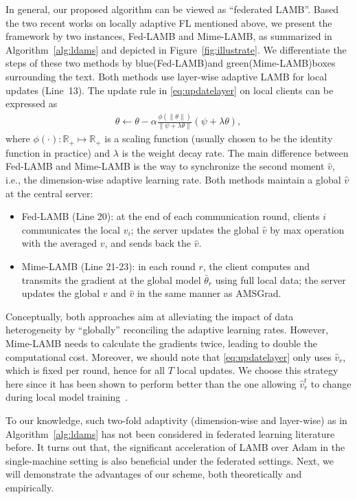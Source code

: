 \documentclass[nohyperref]{article}
\theoremstyle{plain}
\theoremstyle{definition}
\theoremstyle{remark}
\begin{document}
In general, our proposed algorithm can be viewed as ``federated LAMB''. Based the two recent works on locally adaptive FL mentioned above, we present the framework by two instances, Fed-LAMB and Mime-LAMB, as summarized in Algorithm~\ref{alg:ldams} and depicted in Figure~\ref{fig:illustrate}. We differentiate the steps of these two methods by blue\colorbox{blue!20!white}{(Fed-LAMB)}and green\colorbox{green!20!white}{(Mime-LAMB)}boxes surrounding the text. Both methods use layer-wise adaptive LAMB for local updates (Line~13). The update rule in \eqref{eq:updatelayer} on local clients can be expressed as
\begin{align*}
    \theta \leftarrow \theta-\alpha\frac{\phi(\|\theta\|)}{\|\psi+\lambda\theta\|}(\psi+\lambda\theta),
\end{align*}
where $\phi(\cdot): \mathbb R_+ \mapsto \mathbb R_+$ is a scaling function (usually chosen to be the identity function in practice) and $\lambda$ is the weight decay rate. The main difference between Fed-LAMB and Mime-LAMB is the way to synchronize the second moment $\hat v$, i.e., the dimension-wise adaptive learning rate. Both methods maintain a global $\hat v$ at the central server:
\begin{itemize}
    \item \colorbox{blue!20!white}{Fed-LAMB (Line 20)}: at the end of each communication round, clients $i$ communicates the local $v_{i}$; the server updates the global $\hat v$ by max operation with the averaged $v$, and sends back the $\hat v$.
    
    \item \colorbox{green!20!white}{Mime-LAMB (Line 21-23)}: in each round $r$, the client computes and transmits the gradient at the global model $\bar\theta_r$ using full local data; the server updates the global $v$ and $\hat v$ in the same manner as AMSGrad. 
\end{itemize}
Conceptually, both approaches aim at alleviating the impact of data heterogeneity by ``globally'' reconciling the adaptive learning rates. However, Mime-LAMB needs to calculate the gradients twice, leading to double the computational cost. Moreover, we should note that \eqref{eq:updatelayer} only uses $\hat v_r$, which is fixed per round, hence for all $T$ local updates. 
We choose this strategy here since it has been shown to perform better than the one allowing $\hat v_r^t$ to change during local model training~\cite{karimireddy2020mime}.

To our knowledge, such two-fold adaptivity (dimension-wise and layer-wise) as in Algorithm~\ref{alg:ldams} has not been considered in federated learning literature before. It turns out that, the significant acceleration of LAMB over Adam in the single-machine setting is also beneficial under the federated settings. Next, we will demonstrate the advantages of our scheme, both theoretically and empirically.
\end{document}
